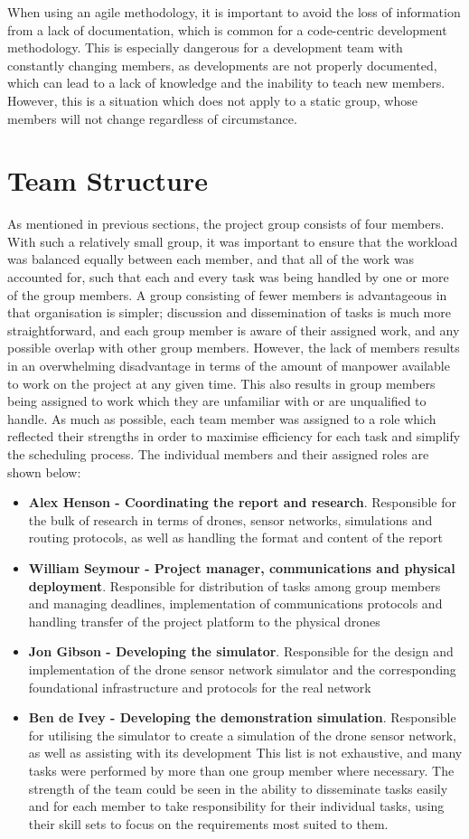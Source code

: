 When using an agile methodology, it is important to avoid the loss of information from a lack of documentation, which is common for a code-centric development methodology. This is especially dangerous for a development team with constantly changing members, as developments are not properly documented, which can lead to a lack of knowledge and the inability to teach new members. However, this is a situation which does not apply to a static group, whose members will not change regardless of circumstance. 
	\section{Team Structure}
As mentioned in previous sections, the project group consists of four members. With such a relatively small group, it was important to ensure that the workload was balanced equally between each member, and that all of the work was accounted for, such that each and every task was being handled by one or more of the group members. A group consisting of fewer members is advantageous in that organisation is simpler; discussion and dissemination of tasks is much more straightforward, and each group member is aware of their assigned work, and any possible overlap with other group members. However, the lack of members results in an overwhelming disadvantage in terms of the amount of manpower available to work on the project at any given time. This also results in group members being assigned to work which they are unfamiliar with or are unqualified to handle.
As much as possible, each team member was assigned to a role which reflected their strengths in order to maximise efficiency for each task and simplify the scheduling process. The individual members and their assigned roles are shown below:
\begin{itemize}
\item \textbf{Alex Henson - Coordinating the report and research}. Responsible for the bulk of research in terms of drones, sensor networks, simulations and routing protocols, as well as handling the format and content of the report
\item \textbf{William Seymour - Project manager, communications and physical deployment}. Responsible for distribution of tasks among group members and managing deadlines, implementation of communications  protocols and handling transfer of the project platform to the physical drones
\item \textbf{Jon Gibson - Developing the simulator}. Responsible for the design and implementation of the drone sensor network simulator and the corresponding  foundational infrastructure and protocols for the real network
\item \textbf{Ben de Ivey - Developing the demonstration simulation}. Responsible for utilising the simulator to create a simulation of the drone sensor network, as well as assisting with its development
This list is not exhaustive, and many tasks were performed by more than one group member where necessary. The strength of the team could be seen in the ability to disseminate tasks easily and for each member to take responsibility for their individual tasks, using their skill sets to focus on the requirements most suited to them.
\end{itemize}

